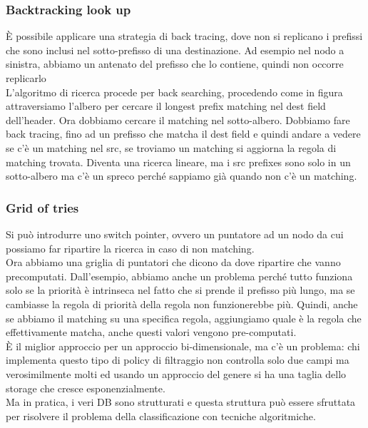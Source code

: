 \documentclass[12pt, oneside]{extbook} %
\begin{document}
\subsubsection{Backtracking look up}
È possibile applicare una strategia di back tracing, dove non si replicano i prefissi che sono inclusi nel sotto-prefisso di una destinazione. Ad esempio nel nodo a sinistra, abbiamo un antenato del prefisso che lo contiene, quindi non occorre replicarlo\\
L'algoritmo di ricerca procede per back searching, procedendo come in figura
attraversiamo l'albero per cercare il longest prefix matching nel dest field dell'header. Ora dobbiamo cercare il matching nel sotto-albero. Dobbiamo fare back tracing, fino ad un prefisso che matcha il dest field e quindi andare a vedere se c'è un matching nel src, se troviamo un matching si aggiorna la regola di matching trovata. Diventa una ricerca lineare, ma i src prefixes sono solo in un sotto-albero ma c'è un spreco perché sappiamo già quando non c'è un matching.
\subsubsection{Grid of tries}
Si può introdurre uno switch pointer, ovvero un puntatore ad un nodo da cui possiamo far ripartire la ricerca in caso di non matching. \\ Ora abbiamo una griglia di puntatori che dicono da dove ripartire che vanno precomputati. Dall'esempio, abbiamo anche un problema perché tutto funziona solo se la priorità è intrinseca nel fatto che si prende il prefisso più lungo, ma se cambiasse la regola di priorità della regola non funzionerebbe più. Quindi, anche se abbiamo il matching su una specifica regola, aggiungiamo quale è la regola che effettivamente matcha, anche questi valori vengono pre-computati.\\ È il miglior approccio per un approccio bi-dimensionale, ma c'è un problema: chi implementa questo tipo di policy di filtraggio non controlla solo due campi ma verosimilmente molti ed usando un approccio del genere si ha una taglia dello storage che cresce esponenzialmente.\\ Ma in pratica, i veri DB sono strutturati e questa struttura può essere sfruttata per risolvere il problema della classificazione con tecniche algoritmiche.
\end{document}
